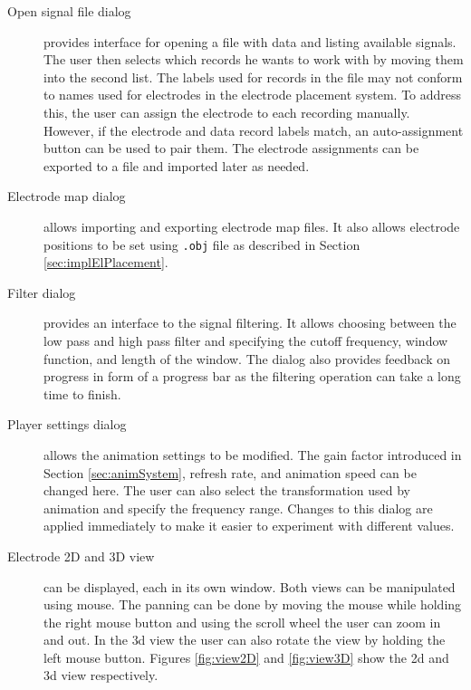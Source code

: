 \begin{description}
	\item[Open signal file dialog] provides interface for opening a file with data and listing available signals. The user then selects which records he wants to work with by moving them into the second list. The labels used for records in the file may not conform to names used for electrodes in the electrode placement system. To address this, the user can assign the electrode to each recording manually. However, if the electrode and data record labels match, an auto-assignment button can be used to pair them. The electrode assignments can be exported to a file and imported later as needed.
	
	\item[Electrode map dialog] allows importing and exporting electrode map files. It also allows electrode positions to be set using \texttt{.obj} file as described in Section \ref{sec:implElPlacement}.
	
	\item[Filter dialog] provides an interface to the signal filtering. It allows choosing between the low pass and high pass filter and specifying the cutoff frequency, window function, and length of the window. The dialog also provides feedback on progress in form of a progress bar as the filtering operation can take a long time to finish.
	
	\item[Player settings dialog] allows the animation settings to be modified. The gain factor introduced in Section \ref{sec:animSystem}, refresh rate, and animation speed can be changed here. The user can also select the transformation used by animation and specify the frequency range. Changes to this dialog are applied immediately to make it easier to experiment with different values.
	
	\item[Electrode 2D and 3D view] can be displayed, each in its own window. Both views can be manipulated using mouse. The panning can be done by moving the mouse while holding the right mouse button and using the scroll wheel the user can zoom in and out. In the \gls{3d} view the user can also rotate the view by holding the left mouse button. Figures \ref{fig:view2D} and \ref{fig:view3D} show the \gls{2d} and \gls{3d} view respectively.
\end{description}

